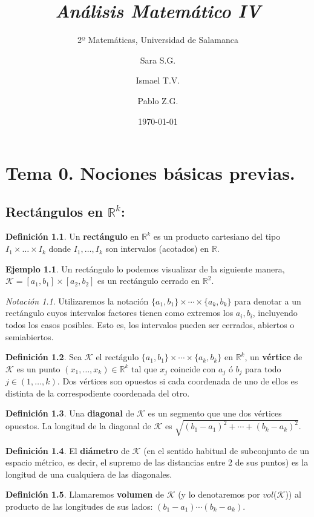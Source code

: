 \documentclass[12pt,twoside]{report}
\title{\textit{\textbf{Análisis Matemático IV}}}
\subtitle{2º Matemáticas, Universidad de Salamanca}
\author{Sara S.G. \and Ismael T.V. \and Pablo Z.G.}
\date {\today}
\newcommand\mc[1]{\mathcal{#1}}
\theoremstyle{azul}
\theoremstyle{azul2}
\theoremstyle{plain}
\theoremstyle{definition}
\newtheorem{eje}{Ejemplo}[chapter]
\newtheorem{defin}{Definición}[chapter]
\theoremstyle{remark}
\newtheorem*{nota}{Notación}
\begin{document}
\maketitle

\tableofcontents

\thispagestyle{empty}
\chapter{\textbf{Tema 0. Nociones básicas previas.}}
\justifying
\setcounter{chapter}{0}
\section{Rectángulos en $\mathbb{R}^k$:}
\begin{defin}
Un \textbf{rectángulo} en $\mathbb{R}^k$ es un producto cartesiano del tipo $I_1 \times \ldots \times I_k$ donde $I_1, \ldots, I_k$ son intervalos (acotados) en $\mathbb{R}$.
\end{defin}
\begin{eje}
Un rectángulo lo podemos visualizar de la siguiente manera,  $\mc{K} = [a_1, b_1] \times [a_2, b_2]$ es un rectángulo cerrado en $\mathbb{R}^2$. 
\end{eje}
\begin{nota}
Utilizaremos la notación $\{a_1,b_1\} \times \cdots \times \{a_k,b_k\}$ para denotar a un rectángulo cuyos intervalos factores tienen como extremos los $a_i, b_i$, incluyendo todos los casos posibles. Esto es, los intervalos pueden ser cerrados, abiertos o semiabiertos.
\end{nota}
\begin{defin}
Sea $\mc{K}$ el rectágulo $\{a_1,b_1\} \times \cdots \times \{a_k,b_k\}$ en $\mathbb{R}^k$, un \textbf{vértice} de $\mc{K}$ es un punto $(x_1, \ldots, x_k) \in \mathbb{R}^k$ tal que $x_j$ coincide con  $a_j$ ó $b_j$ para todo $j \in (1, \ldots, k)$. Dos vértices son opuestos si cada coordenada de uno de ellos es distinta de la correspodiente coordenada del otro.
\end{defin}
\begin{defin}
Una \textbf{diagonal} de $\mc{K}$ es un segmento que une dos vértices opuestos. La longitud de la diagonal de $\mc{K}$ es $\sqrt{(b_1-a_1)^2 + \cdots + (b_k-a_k)^2}$.
\end{defin}
\begin{defin}
El \textbf{diámetro} de $\mc{K}$ (en el sentido habitual de subconjunto de un espacio métrico, es decir, el supremo de las distancias entre 2 de sus puntos) es la longitud de una cualquiera de las diagonales.
\end{defin}
\begin{defin}
Llamaremos \textbf{volumen} de $\mc{K}$ (y lo denotaremos por $vol$($\mc{K}$)) al producto de las longitudes de sus lados: $(b_1-a_1) \cdots (b_k-a_k)$.
\end{defin}
\end{document}
